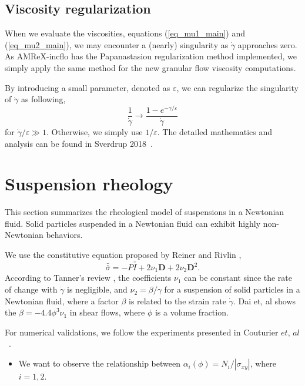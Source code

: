 \subsection{Viscosity regularization}
When we evaluate the viscosities, equations (\ref{eq_mu1_main}) and (\ref{eq_mu2_main}), we may encounter a (nearly) singularity as $\dot{\gamma}$ approaches zero.
As AMReX-incflo has the Papanastasiou regularization method implemented, we simply apply the same method for the new granular flow viscosity computations.
\par
By introducing a small parameter, denoted as $\varepsilon$, we can regularize the singularity of $\dot{\gamma}$ as following,
\[
  \frac{1}{\dot{\gamma}} \rightarrow \frac{1-e^{-\dot{\gamma} / \varepsilon}}{\dot{\gamma}}  
\]
for $\dot{\gamma}/\varepsilon \gg 1$. Otherwise, we simply use $1/\varepsilon$. 
The detailed mathematics and analysis can be found in Sverdrup 2018~\cite{sverdrup_highly_2018}.
\section{Suspension rheology}
This section summarizes the rheological model of suspensions in a Newtonian fluid. Solid particles suspended in a Newtonian fluid can exhibit highly non-Newtonian behaviors.  
\par
We use the constitutive equation proposed by Reiner \cite{reiner_mathematical_1945} and Rivlin \cite{rivlin_stress-deformation_1955},  
\begin{equation}
  \bar{\bar{\sigma}} = -P \bar{\bar{I}}
  + 2 \nu_1 {\bm{D}} + 2 \nu_2 {\bm{D}}^2.
\end{equation}
According to Tanner's review \cite{tanner_review_2018}, the coefficients $\nu_1$ can be constant since the rate of change with $\dot{\gamma}$ is negligible, and $\nu_2 = \beta / \dot{\gamma}$ for a suspension of solid particles in a Newtonian fluid, where a factor $\beta$ is related to the strain rate $\dot{\gamma}$. Dai et, al \cite{dai_viscometric_2013} shows the $\beta = -4.4 \phi^3 \nu_1$ in shear flows, where $\phi$ is a volume fraction. 
\par
For numerical validations, we follow the experiments presented in Couturier $\textit{et, al}$~\cite{couturier_suspensions_2011}.
\begin{itemize}
  \item We want to observe the relationship between $\alpha_i(\phi) = N_i / |\sigma_{xy}|$, where $i = 1,2$.
\end{itemize}

